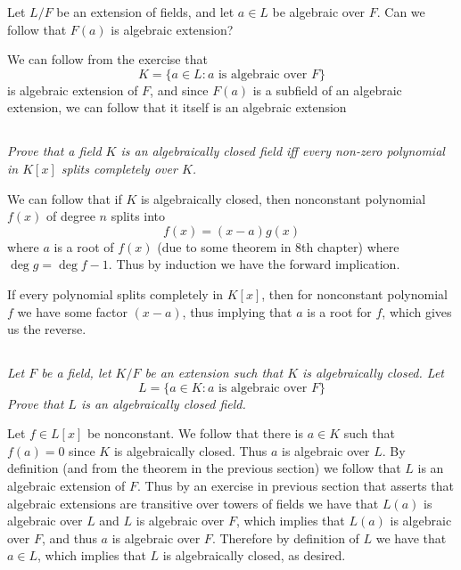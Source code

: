 \documentclass[11pt,oneside,titlepage]{book}
\newcommand{\set}[1]{\{ #1 \}}
\begin{document}
Let $L/F$ be an extension of fields, and let $a \in L$ be algebraic
over $F$. Can we follow that $F(a)$ is algebraic extension?

We can follow from the exercise that
$$K = \set{a \in L: a \text{ is algebraic over } F}$$
is algebraic extension of $F$, and since $F(a)$ is a subfield of an
algebraic extension, we can follow that it itself is an algebraic
extension

\subsection{}

\textit{Prove that a field $K$ is an algebraically closed field iff every non-zero
  polynomial in $K[x]$ splits completely over $K$.}

We can follow that if $K$ is algebraically closed, then nonconstant
polynomial $f(x)$ of degree $n$ splits into
$$f(x) = (x - a)g(x)$$
where $a$ is a root of $f(x)$ (due to some theorem in 8th chapter)
where $\deg g = \deg f - 1$. Thus by induction we have the forward
implication.

If every polynomial splits completely in $K[x]$, then for nonconstant
polynomial $f$ we have some factor $(x - a)$, thus implying that $a$
is a root for $f$, which gives us the reverse.


\subsection{}

\textit{Let $F$ be a field, let $K/F$ be an extension such that $K$ is
  algebraically closed. Let
  $$L = \set{a \in K: a \text{ is algebraic over } F}$$
  Prove that $L$ is an algebraically closed field.}

Let $f \in L[x]$ be nonconstant. We follow that there is $a \in K$
such that $f(a) = 0$ since $K$ is algebraically closed. Thus $a$ is
algebraic over $L$.  By definition (and from the theorem in the
previous section) we follow that $L$ is an algebraic extension of $F$.
Thus by an exercise in previous section that asserts that algebraic
extensions are transitive over towers of fields we have that $L(a)$ is
algebraic over $L$ and $L$ is algebraic over $F$, which implies that
$L(a)$ is algebraic over $F$, and thus $a$ is algebraic over
$F$. Therefore by definition of $L$ we have that $a \in L$, which
implies that $L$ is algebraically closed, as desired. 

\subsection{}
\end{document}
